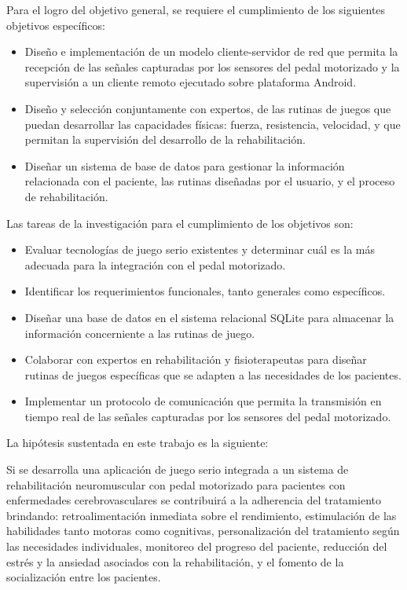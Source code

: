 \begin{introduction}
    \vspace{5pt}
    Para el logro del objetivo general, se requiere el cumplimiento de los siguientes objetivos específicos:

    \begin{itemize}
        \item Diseño e implementación de un modelo cliente-servidor de red que permita la recepción de las señales capturadas por los sensores del pedal motorizado y la supervisión a un cliente remoto ejecutado sobre plataforma Android.
        \item  Diseño y selección conjuntamente con expertos, de las rutinas de juegos que puedan desarrollar las capacidades físicas: fuerza, resistencia, velocidad, y que permitan la supervisión del desarrollo de la rehabilitación.
        \item Diseñar un sistema de base de datos para gestionar la información relacionada con el paciente, las rutinas diseñadas por el usuario, y el proceso de rehabilitación.
    \end{itemize}

    Las tareas de la investigación para el cumplimiento de los objetivos son:
    \begin{itemize}
        \item Evaluar tecnologías de juego serio existentes y determinar cuál es la más adecuada para la integración con el pedal motorizado.
        \item Identificar los requerimientos funcionales, tanto generales como específicos.
        \item Diseñar una base de datos en el sistema relacional SQLite para almacenar la información concerniente a las rutinas de juego. 
        \item Colaborar con expertos en rehabilitación y fisioterapeutas para diseñar rutinas de juegos específicas que se adapten a las necesidades de los pacientes.
        \item Implementar un protocolo de comunicación que permita la transmisión en tiempo real de las señales capturadas por los sensores del pedal motorizado. 
    \end{itemize}

    La hipótesis sustentada en este trabajo es la siguiente:

    Si se desarrolla una aplicación de juego serio integrada a un sistema de rehabilitación neuromuscular con pedal motorizado para pacientes con enfermedades cerebrovasculares se contribuirá a la adherencia del tratamiento brindando: retroalimentación inmediata sobre el rendimiento, estimulación de las habilidades tanto motoras como cognitivas, personalización del tratamiento según las necesidades individuales, monitoreo del progreso del paciente, reducción del estrés y la ansiedad asociados con la rehabilitación, y el fomento de la socialización entre los pacientes.


\end{introduction}
